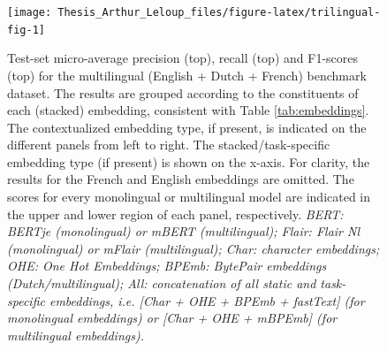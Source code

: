 \documentclass[12pt,a4paper,]{book}
\begin{document}
\begin{figure}

{\centering \texttt{[image: Thesis\_Arthur\_Leloup\_files/figure-latex/trilingual-fig-1]} 

}

\caption{Test-set micro-average precision (top), recall (top) and F1-scores (top) for the multilingual (English + Dutch + French) benchmark dataset. The results are grouped according to the constituents of each (stacked) embedding, consistent with Table \ref{tab:embeddings}. The contextualized embedding type, if present, is indicated on the different panels from left to right. The stacked/task-specific embedding type (if present) is shown on the x-axis. For clarity, the results for the French and English embeddings are omitted. The scores for every monolingual or multilingual model are indicated in the upper and lower region of each panel, respectively. \emph{BERT: BERTje (monolingual) or mBERT (multilingual); Flair: Flair Nl (monolingual) or mFlair (multilingual); Char: character embeddings; OHE: One Hot Embeddings; BPEmb: BytePair embeddings (Dutch/multilingual); All: concatenation of all static and task-specific embeddings, i.e. {[}Char + OHE + BPEmb + fastText{]} (for monolingual embeddings) or {[}Char + OHE + mBPEmb{]} (for multilingual embeddings).}}\label{fig:trilingual-fig}
\end{figure}
\end{document}
